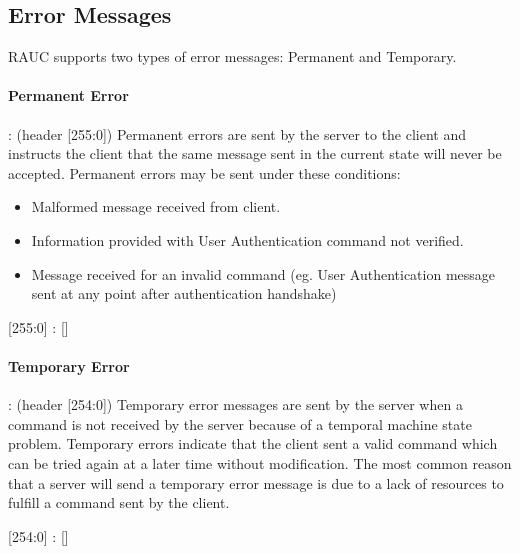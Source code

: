\subsection{Error Messages}
\label{sec:pdus:err}
RAUC supports two types of error messages: Permanent and Temporary.

\paragraph{Permanent Error}: (header [255:0]) Permanent errors are sent by the server to the client and instructs the client that the same message sent in the current state will never be accepted. Permanent errors may be sent under these conditions:
\begin{itemize}
\item Malformed message received from client.
\item Information provided with User Authentication command not verified.
\item Message received for an invalid command (eg. User Authentication message sent at any point after authentication handshake)
  \end{itemize}
  
\begin{center}
{\textsf{[255:0] : []}}
\end{center}

\paragraph{Temporary Error}: (header [254:0]) Temporary error messages are sent by the server when a command is not received by the server because of a temporal machine state problem. Temporary errors indicate that the client sent a valid command which can be tried again at a later time without modification. The most common reason that a server will send a temporary error message is due to a lack of resources to fulfill a command sent by the client.

\begin{center}
{\textsf{[254:0] : []}}
\end{center}
